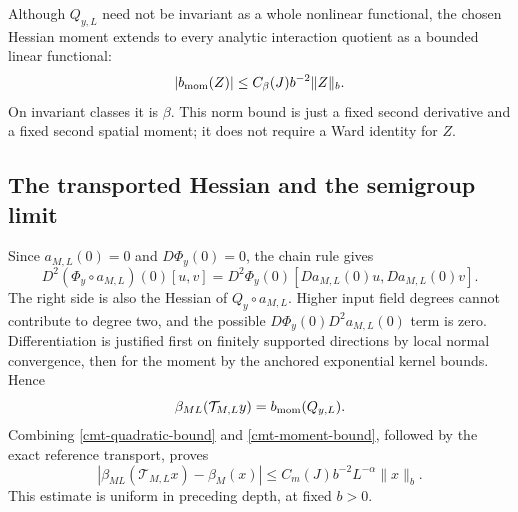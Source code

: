 \documentclass[11pt]{article}
\theoremstyle{remark}
\begin{document}
Although \(Q_{y,L}\) need not be invariant as a whole nonlinear
functional, the chosen Hessian moment extends to every analytic
interaction quotient as a bounded linear functional:
\begin{equation}
 |b_{\rm mom}(Z)|\le C_\beta(J)b^{-2}\|Z\|_b.
 \label{cmt-moment-bound}
\end{equation}
On invariant classes it is \(\beta\). This norm bound is just
a fixed second derivative and a fixed second spatial moment;
it does not require a Ward identity for \(Z\).

\subsection{The transported Hessian and the semigroup limit}
\label{cmt-preservation-section}

Since \(a_{M,L}(0)=0\) and \(D\Phi_y(0)=0\), the chain rule gives
\begin{equation}
 D^2(\Phi_y\circ a_{M,L})(0)[u,v]
   =D^2\Phi_y(0)[Da_{M,L}(0)u,Da_{M,L}(0)v].
 \label{cmt-chain-rule}
\end{equation}
The right side is also the Hessian of
\(Q_y\circ a_{M,L}\). Higher input field degrees cannot
contribute to degree two, and the possible
\(D\Phi_y(0)D^2a_{M,L}(0)\) term is zero.
Differentiation is justified first on finitely supported
directions by local normal convergence, then for the moment
by the anchored exponential kernel bounds. Hence
\begin{equation}
 \beta_{ML}(\mathcal T_{M,L}y)=b_{\rm mom}(Q_{y,L}).
 \label{cmt-hessian-identification}
\end{equation}
Combining \eqref{cmt-quadratic-bound} and
\eqref{cmt-moment-bound}, followed by the exact reference
transport, proves
\begin{equation}
 |\beta_{ML}(\mathcal T_{M,L}x)-\beta_M(x)|
       \le C_m(J)b^{-2}L^{-\alpha}\|x\|_b.
 \label{cmt-asymptotic}
\end{equation}
This estimate is uniform in preceding depth, at fixed \(b>0\).
\end{document}
